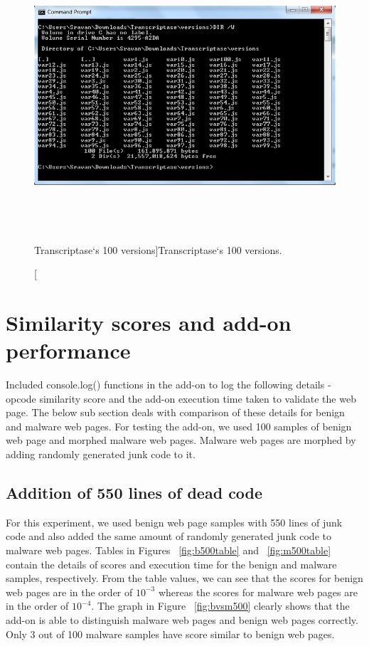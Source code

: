 \begin{figure}[h]
  \centering
      \includegraphics[width=16.875cm, height=10cm]{Capture.PNG}
    \caption[Transcriptase`s 100 versions]{Transcriptase`s 100 versions.}
    \label{fig:100versions}
\end{figure}

\section{Similarity scores and add-on performance}
Included console.log() functions in the add-on to log the following details - opcode similarity score and the add-on execution time taken to validate the web page. The below sub section deals with comparison of these details for benign and malware web pages. For testing the add-on, we used 100 samples of benign web page and morphed malware web pages. Malware web pages are morphed by adding randomly generated junk code to it.
\subsection{Addition of 550 lines of dead code}
For this experiment, we used benign web page samples with 550 lines of junk code and also added the same amount of randomly generated junk code to malware web pages. Tables in Figures ~\ref{fig:b500table} and  ~\ref{fig:m500table} contain the details of scores and execution time for the benign and malware samples, respectively. From the table values, we can see that the scores for benign web pages are in the order of $10^{-3}$ whereas the scores for malware web pages are in the order of $10^{-4}$. The graph in Figure ~\ref{fig:bvsm500} clearly shows that the add-on is able to distinguish malware web pages and benign web pages correctly. Only 3 out of 100 malware samples have score similar to benign web pages.

